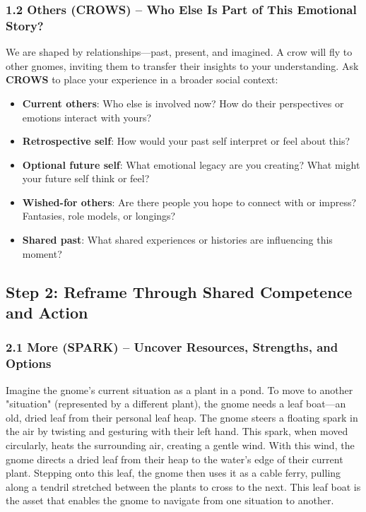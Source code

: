 \documentclass{article}
\begin{document}
\subsubsection{1.2 Others (CROWS) – Who Else Is Part of This Emotional Story?}
We are shaped by relationships—past, present, and imagined. A crow will fly to other gnomes, inviting them to transfer their insights to your understanding. Ask \textbf{CROWS} to place your experience in a broader social context:
\begin{itemize}[noitemsep,topsep=0pt]
    \item \textbf{Current others}: Who else is involved now? How do their perspectives or emotions interact with yours?
    \item \textbf{Retrospective self}: How would your past self interpret or feel about this?
    \item \textbf{Optional future self}: What emotional legacy are you creating? What might your future self think or feel?
    \item \textbf{Wished-for others}: Are there people you hope to connect with or impress? Fantasies, role models, or longings?
    \item \textbf{Shared past}: What shared experiences or histories are influencing this moment?
\end{itemize}

\subsection{Step 2: Reframe Through Shared Competence and Action}

\subsubsection{2.1 More (SPARK) – Uncover Resources, Strengths, and Options}
Imagine the gnome's current situation as a plant in a pond. To move to another "situation" (represented by a different plant), the gnome needs a leaf boat—an old, dried leaf from their personal leaf heap. The gnome steers a floating spark in the air by twisting and gesturing with their left hand. This spark, when moved circularly, heats the surrounding air, creating a gentle wind. With this wind, the gnome directs a dried leaf from their heap to the water's edge of their current plant. Stepping onto this leaf, the gnome then uses it as a cable ferry, pulling along a tendril stretched between the plants to cross to the next. This leaf boat is the asset that enables the gnome to navigate from one situation to another.
\end{document}
